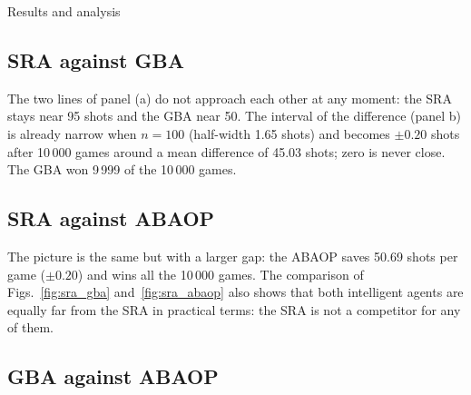 \documentclass[letterpaper,11pt]{article} %
\begin{document}
\begin{Resultados}{Results and analysis}
\subsection*{SRA against GBA}

\begin{center}
    \begin{minipage}{0.92\textwidth}
        \centering
        \label{fig:sra_gba}
    \end{minipage}
\end{center}

The two lines of panel (a) do not approach each other at any moment: the SRA stays near 95 shots and the GBA near 50. The interval of the difference (panel b) is already narrow when $n=100$ (half-width 1.65 shots) and becomes $\pm0.20$ shots after 10\,000 games around a mean difference of 45.03 shots; zero is never close. The GBA won 9\,999 of the 10\,000 games.

\subsection*{SRA against ABAOP}

\begin{center}
    \begin{minipage}{0.92\textwidth}
        \centering
        \label{fig:sra_abaop}
    \end{minipage}
\end{center}

The picture is the same but with a larger gap: the ABAOP saves 50.69 shots per game ($\pm0.20$) and wins all the 10\,000 games. The comparison of Figs.~\ref{fig:sra_gba} and~\ref{fig:sra_abaop} also shows that both intelligent agents are equally far from the SRA in practical terms: the SRA is not a competitor for any of them.

\subsection*{GBA against ABAOP}


\end{Resultados}
\end{document}
